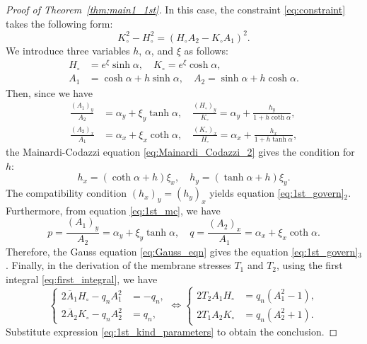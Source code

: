 \documentclass[a4paper]{amsart}
\theoremstyle{definition}
\begin{document}
\begin{proof}[Proof of Theorem~\ref{thm:main1_1st}]
In this case, the constraint \eqref{eq:constraint} takes the following form:
\begin{equation}
K_\circ^2 - H_\circ^2 = (H_\circ A_2 - K_\circ A_1)^2.
\end{equation}
We introduce three variables $h$, $\alpha$, and $\xi$ as follows:
\begin{equation}
\label{eq:1st_kind_parameters}
\begin{aligned}
H_\circ &= e^\xi \sinh \alpha, \quad
K_\circ = e^\xi \cosh \alpha,\\
A_1 &= \cosh \alpha + h \sinh \alpha, \quad
A_2 = \sinh \alpha + h \cosh \alpha.
\end{aligned}
\end{equation}
Then, since we have
\begin{equation}
\label{eq:1st_mc}
\begin{aligned}
\frac{(A_1)_y}{A_2} &= \alpha_y + \xi_y \tanh \alpha, \quad
\frac{(H_\circ)_y}{K_\circ} = \alpha_y + \frac{h_y}{1+h \coth \alpha},\\
\frac{(A_2)_x}{A_1} &= \alpha_x + \xi_x \coth \alpha, \quad
\frac{(K_\circ)_x}{H_\circ} = \alpha_x + \frac{h_x}{1+h \tanh \alpha},
\end{aligned}
\end{equation}
the Mainardi-Codazzi equation \eqref{eq:Mainardi_Codazzi_2} gives the condition for $h$:
\begin{equation}
h_x = (\coth \alpha + h) \xi_x, \quad
h_y = (\tanh \alpha + h) \xi_y.
\end{equation}
The compatibility condition $(h_x)_y = (h_y)_x$ yields equation \eqref{eq:1st_govern}${}_2$.
Furthermore, from equation \eqref{eq:1st_mc}, we have
\begin{equation}
p = \frac{(A_1)_y}{A_2} = \alpha_y + \xi_y \tanh \alpha, \quad
q = \frac{(A_2)_x}{A_1} = \alpha_x + \xi_x \coth \alpha.
\end{equation}
Therefore, the Gauss equation \eqref{eq:Gauss_eqn} gives the equation \eqref{eq:1st_govern}${}_3$.
Finally, in the derivation of the membrane stresses $T_1$ and $T_2$, using the first integral \eqref{eq:first_integral}, we have
\begin{equation}
\left\{
\begin{aligned}
2\overline{A}_1 H_\circ - q_n A_1^2 &= -q_n,\\
2\overline{A}_2 K_\circ - q_n A_2^2 &= q_n,
\end{aligned}
\right.
\iff
\left\{
\begin{aligned}
2T_2 A_1 H_\circ &= q_n (A_1^2 - 1),\\
2T_1 A_2 K_\circ &= q_n (A_2^2 + 1).
\end{aligned}
\right.
\end{equation}
Substitute expression \eqref{eq:1st_kind_parameters} to obtain the conclusion.
\end{proof}
\end{document}
